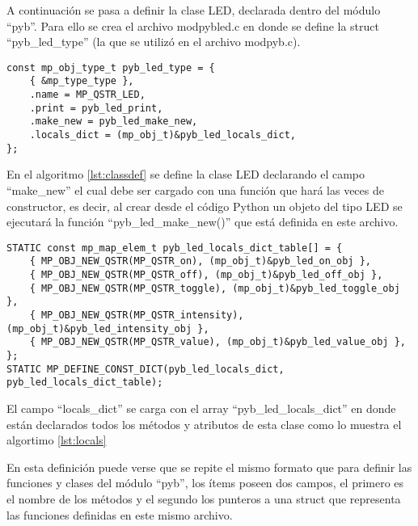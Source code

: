 A continuación se pasa a definir la clase LED, declarada dentro del módulo “pyb”. Para ello se crea el archivo modpybled.c en donde se define la struct “pyb\_led\_type” (la que se utilizó en el archivo modpyb.c).

\begin{lstlisting}[label={lst:classdef},caption=Estructura que define la clase LED.] 
const mp_obj_type_t pyb_led_type = {
    { &mp_type_type },
    .name = MP_QSTR_LED,
    .print = pyb_led_print,
    .make_new = pyb_led_make_new,
    .locals_dict = (mp_obj_t)&pyb_led_locals_dict,
};
\end{lstlisting}

En el algoritmo \ref{lst:classdef} se define la clase LED declarando el campo “make\_new” el cual debe ser cargado con una función que hará las veces de constructor, es decir, al crear desde el código Python un objeto del tipo LED se ejecutará la función “pyb\_led\_make\_new()” que está definida en este archivo.

\begin{lstlisting}[label={lst:locals},caption=Definición de métodos de la clase LED.] 
STATIC const mp_map_elem_t pyb_led_locals_dict_table[] = {
    { MP_OBJ_NEW_QSTR(MP_QSTR_on), (mp_obj_t)&pyb_led_on_obj },
    { MP_OBJ_NEW_QSTR(MP_QSTR_off), (mp_obj_t)&pyb_led_off_obj },
    { MP_OBJ_NEW_QSTR(MP_QSTR_toggle), (mp_obj_t)&pyb_led_toggle_obj },
    { MP_OBJ_NEW_QSTR(MP_QSTR_intensity), (mp_obj_t)&pyb_led_intensity_obj },
    { MP_OBJ_NEW_QSTR(MP_QSTR_value), (mp_obj_t)&pyb_led_value_obj },
};
STATIC MP_DEFINE_CONST_DICT(pyb_led_locals_dict, pyb_led_locals_dict_table);
\end{lstlisting}

El campo “locals\_dict” se carga con el array “pyb\_led\_locals\_dict” en donde están declarados todos los métodos y atributos de esta clase como lo muestra el algortimo \ref{lst:locals}

En esta definición puede verse que se repite el mismo formato que para definir las funciones y clases del módulo “pyb”, los ítems poseen dos campos, el primero es el nombre de los métodos y el segundo los punteros a una struct que representa las funciones definidas en este mismo archivo.


